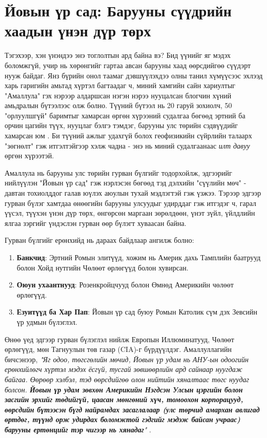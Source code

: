 \documentclass[10pt,twocolumn,letterpaper]{article}
\begin{document}
\section{Йовын үр сад: Барууны сүүдрийн хаадын үнэн дүр төрх}

Тэгэхээр, хэн үнэндээ энэ тоглолтын ард байна вэ? Бид үүнийг яг мэдэх боломжгүй, учир нь хөрөнгийг гартаа авсан барууны хаад өөрсдийгөө сүүдэрт нууж байдаг. Янз бүрийн онол таамаг дэвшүүлэхдээ олны танил хүмүүсээс эхлээд харь гаригийн амьтад хүртэл багтаадаг ч, миний хамгийн сайн хариултыг "Амаллула" гэх нэрээр алдаршсан нэгэн нэрээ нууцалсан блогчин хүний амьдралын бүтээлээс олж болно. Түүний бүтээл нь 20 гаруй зохиолч, 50 "орлуулшгүй" баримтыг хамарсан өргөн хүрээний судалгаа бөгөөд эртний ба орчин цагийн түүх, нууцлаг бэлгэ тэмдэг, барууны улс төрийн сэдвүүдийг хамарсан юм \cite{33,34}. Би түүний ажлыг удахгүй болох геофизикийн сүйрлийн талаарх "зөгнөлт" гэж итгэлтэйгээр хэлж чадна - энэ нь миний судалгаанаас \textit{илт давуу} өргөн хүрээтэй.

Амаллула нь барууны улс төрийн гурван бүлгийг тодорхойлж, эдгээрийг нийлүүлэн "Йовын үр сад" гэж нэрлэсэн бөгөөд тэд дэлхийн "сүүлийн мөч" - давтан тохиолддог галав юүлэх аюулын тухай мэдлэгтэй гэж үзжээ. Тэрээр эдгээр гурван бүлэг хамтдаа өнөөгийн барууны улсуудыг удирддаг гэж итгэдэг ч, гарал үүсэл, түүхэн үнэн дүр төрх, өнгөрсөн маргаан зөрөлдөөн, үнэт зүйл, үйлдлийн ялгаа зэргийг үндэслэн гурван өөр бүлэгт хуваасан байна.

Гурван бүлгийг ерөнхийд нь дараах байдлаар ангилж болно:

\begin{flushleft}
\begin{enumerate}
\item \textbf{Банкчид}: Эртний Ромын элитүүд, хожим нь Америк дахь Тамплийн баатрууд болон Хойд нутгийн Чөлөөт өрлөгүүд болон хувирсан.
\item \textbf{Оюун ухаантнууд}: Розенкройцчууд болон Өмнөд Америкийн чөлөөт өрлөгүүд.
\item \textbf{Езуитүүд ба Хар Пап}: Йовын үр сад буюу Ромын Католик сүм дэх Зевсийн үр удмын бүлэглэл. 
\end{enumerate}
\end{flushleft}

Өнөө үед эдгээр гурван бүлэглэл нийлж Европын Иллюминатууд, Чөлөөт өрлөгүүд, мөн Тагнуулын төв газар (CIA)-г бүрдүүлдэг. Амаллуллагийн бичсэнээр, \textit{"Яг одоо, төгсгөлийн мөчид, Йовын үр удам нь АНУ-ын одоогийн ерөнхийлөгч хүртэл мэдэх ёсгүй, тусгай зөвшөөрлийн ард сайнаар нуугдаж байгаа. Өөрөөр хэлбэл, тэд өөрсдийгөө олон нийтийн хяналтаас төгс нуудаг болсон. \textbf{Йовын үр удам зөвхөн Америкийн Нэгдсэн Улсын цэргийн болон засгийн эрхийг төдийгүй, цаасан мөнгөний хүч, томоохон корпорацууд, өөрсдийн бүтээсэн бүгд найрамдах засаглалаар (улс төрчид амархан авлигад өртдөг, түүнд орж удирдах боломжтой гэдгийг мэдэж байсан учраас) барууны ертөнцийг тэр чигээр нь хянадаг}"} \cite{33,34}.
\end{document}
